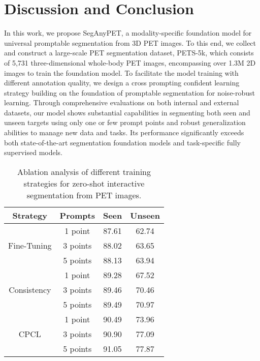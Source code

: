 \section{Discussion and Conclusion}
In this work, we propose SegAnyPET, a modality-specific foundation model for universal promptable segmentation from 3D PET images.
To this end, we collect and construct a large-scale PET segmentation dataset, PETS-5k, which consists of 5,731 three-dimensional whole-body PET images, encompassing over 1.3M 2D images to train the foundation model.
To facilitate the model training with different annotation quality, we design a cross prompting confident learning strategy building on the foundation of promptable segmentation for noise-robust learning.
Through comprehensive evaluations on both internal and external datasets,
our model shows substantial capabilities in segmenting both seen and unseen targets using only one or few prompt points and robust generalization abilities to manage new data and tasks.
Its performance significantly exceeds both state-of-the-art segmentation foundation models and task-specific fully supervised models.

\begin{table}[h]
    \centering
    \normalsize
    \setlength\tabcolsep{9pt}
	\renewcommand\arraystretch{1.1}
	\begin{tabular}{c|c|c|c}
		\hline 	\hline
		Strategy  & Prompts & Seen & Unseen \\ \hline
\multirow{3}{*}{Fine-Tuning}  & 1 point & 87.61 & 62.74  \\
& 3 points & 88.02 & 63.65 \\
& 5 points & 88.13 & 63.94 \\ \hline 
\multirow{3}{*}{Consistency} & 1 point & 89.28 & 67.52 \\
& 3 points & 89.46 & 70.46 \\
& 5 points & 89.49 & 70.97 \\ \hline 
\multirow{3}{*}{CPCL} & 1 point & 90.49 & 73.96   \\ 
& 3 points & 90.90 & 77.09 \\
& 5 points & 91.05 & 77.87 \\  \hline \hline
	\end{tabular}
	\caption{Ablation analysis of different training strategies for zero-shot interactive segmentation from PET images. } \label{Table_Ablation}
\end{table}

